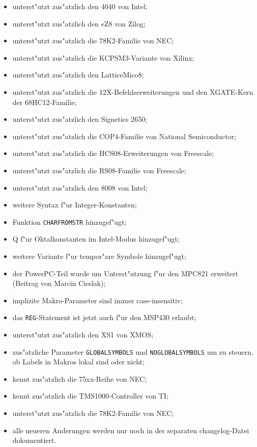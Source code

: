 \documentclass[12pt,a4paper,twoside]{report}
\newcommand{\tty}[1]{{\tt #1}}
\begin{document}
{\begin{itemize}
{\begin{itemize}
{            Semiconductor;}
      \item{unterst"utzt zus"atzlich den 4040 von Intel;}
      \item{unterst"utzt zus"atzlich den eZ8 von Zilog;}
      \item{unterst"utzt zus"atzlich die 78K2-Familie von NEC;}
      \item{unterst"utzt zus"atzlich die KCPSM3-Variante von Xilinx;}
      \item{unterst"utzt zus"atzlich den LatticeMico8;}
      \item{unterst"utzt zus"atzlich die 12X-Befehlserweiterungen
            und den XGATE-Kern der 68HC12-Familie;}
      \item{unterst"utzt zus"atzlich den Signetics 2650;}
      \item{unterst"utzt zus"atzlich die COP4-Familie von National
            Semiconductor;}
      \item{unterst"utzt zus"atzlich die HCS08-Erweiterungen von Freescale;}
      \item{unterst"utzt zus"atzlich die RS08-Familie von Freescale;}
      \item{unterst"utzt zus"atzlich den 8008 von Intel;}
      \item{weitere Syntax f"ur Integer-Konstanten;}
      \item{Funktion \tty{CHARFROMSTR} hinzugef"ugt;}
      \item{Q f"ur Oktalkonstanten im Intel-Modus hinzugef"ugt;}
      \item{weitere Variante f"ur tempor"are Symbole hinzugef"ugt;}
      \item{der PowerPC-Teil wurde um Unterst"utzung f"ur den MPC821 erweitert
            (Beitrag von Marcin Cieslak);}
      \item{implizite Makro-Parameter sind immer case-insensitiv;}
      \item{das \tty{REG}-Statement ist jetzt auch f"ur den MSP430
            erlaubt;}
      \item{unterst"utzt zus"atzlich den XS1 von XMOS;}
      \item{zus"atzliche Parameter \tty{GLOBALSYMBOLS} und
            \tty{NOGLOBALSYMBOLS} um zu steuern, ob Labels
            in Makros lokal sind oder nicht;}
      \item{kennt zus"atzlich die 75xx-Reihe von NEC;}
      \item{kennt zus"atzlich die TMS1000-Controller von TI;}
      \item{unterst"utzt zus"atzlich die 78K2-Familie von NEC;}
      \item{alle neueren Anderungen werden nur noch in der
            separaten changelog-Datei dokumentiert.}
      \end{itemize}}
\end{itemize}

}
\end{document}
